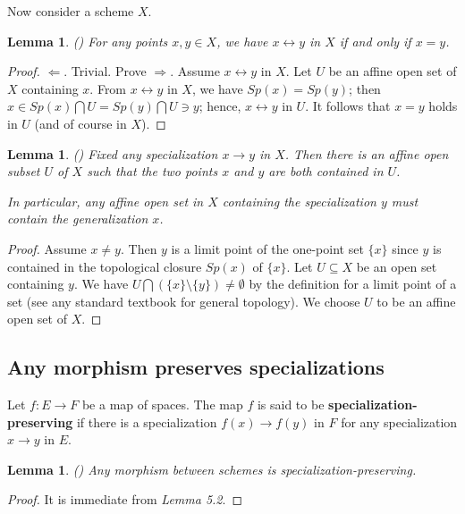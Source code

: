 \documentclass[12pt,twoside,reqno]{amsart}
\newtheorem{lemma}[theorem]{Lemma}
\theoremstyle{definition}
\numberwithin{equation}{section}
\begin{document}
Now consider a scheme $X$.

\begin{lemma}
\emph{(\cite{An1})}
For any points $x,y \in X$, we have $x\leftrightarrow y$ in $X$ if and
only if $x=y$.
\end{lemma}

\begin{proof}
$\Leftarrow$. Trivial. Prove $\Rightarrow$. Assume $x\leftrightarrow
y$ in $X$. Let $U$ be an affine open set of $X$ containing $x$.
From $x\leftrightarrow y$ in $X$, we have ${Sp}(x)={Sp}(y)$; then $x\in{Sp}
(x)\bigcap U={Sp}(y)\bigcap U \ni y$; hence, $x\leftrightarrow y $
in $U$. It follows that $x=y$ holds in $U$ (and of course in $
X$).
\end{proof}

\begin{lemma}
\emph{(\cite{An1})}
Fixed any specialization $x\rightarrow y$ in $X$. Then there is an
affine open subset $U$ of $X$ such that the two points $x$ and $y$ are both
contained in $U$.

In particular, any affine open set in $X$
containing the specialization $y$ must contain the generalization $x$.
\end{lemma}

\begin{proof}
Assume $x \not= y$. Then
$y$ is a limit point of the one-point set $\{x\}$ since $y$ is
contained in the topological closure $Sp(x)$ of $\{x\}$. Let
$U\subseteq X$ be an open set containing $y$. We have $U \bigcap
(\{x\}\setminus \{y\})\neq \emptyset$ by the definition for a limit
point of a set (see any standard textbook for general topology). We
choose $U$ to be an affine open set of $X$.
\end{proof}


\subsection{Any morphism preserves specializations}


Let $f:E\rightarrow F$ be a map of spaces. The map $f$ is said to be \textbf{
specialization-preserving} if there is a specialization $f\left(
x\right) \rightarrow f\left( y\right) $ in $F$ for any
specialization $x\rightarrow y$ in $E$.

\begin{lemma}
\emph{(\cite{An1})}
Any morphism between schemes is specialization-preserving.
\end{lemma}

\begin{proof}
It is immediate from  \emph{Lemma 5.2}.
\end{proof}
\end{document}
